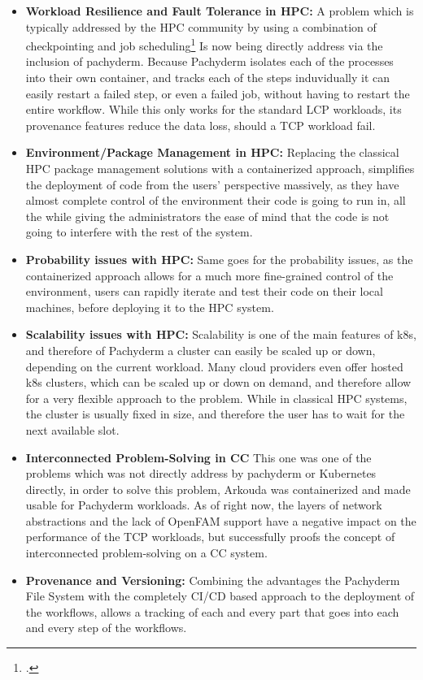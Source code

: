 \begin{itemize}
    \item \textbf{Workload Resilience and Fault Tolerance in HPC:}
    A problem which is typically addressed by the \ac{HPC} community by using a combination of checkpointing and job scheduling\footcite{jinOptimizingHPCFaultTolerant2010}
    Is now being directly address via the inclusion of pachyderm.
    Because Pachyderm isolates each of the processes into their own container, and tracks each of the steps induvidually
    it can easily restart a failed step, or even a failed job, without having to restart the entire workflow.
    While this only works for the standard \ac{LCP} workloads, its provenance features reduce the data loss, should a \ac{TCP} workload fail.
    \item \textbf{Environment/Package Management in HPC:} 
    Replacing the classical \ac{HPC} package management solutions with a containerized approach,
    simplifies the deployment of code from the users' perspective massively, as they have almost complete control of the environment their code 
    is going to run in, all the while giving the administrators the ease of mind that the code is not going to interfere with the rest of the system.
    \item \textbf{Probability issues with HPC:}
    Same goes for the probability issues, as the containerized approach allows for a much more fine-grained control of the environment,
    users can rapidly iterate and test their code on their local machines, before deploying it to the \ac{HPC} system.
    \item \textbf{Scalability issues with HPC:}
    Scalability is one of the main features of \ac{k8s}, and therefore of Pachyderm a cluster can easily be scaled up or down, depending on the current workload.
    Many cloud providers even offer hosted \ac{k8s} clusters, which can be scaled up or down on demand, and therefore allow for a very flexible approach to the problem.
    While in classical \ac{HPC} systems, the cluster is usually fixed in size, and therefore the user has to wait for the next available slot.
    \item \textbf{Interconnected Problem-Solving in \ac{CC}}
    This one was one of the problems which was not directly address by pachyderm or Kubernetes directly,
    in order to solve this problem, Arkouda was containerized and made usable for Pachyderm workloads.
    As of right now, the layers of network abstractions and the lack of OpenFAM support have a negative impact on the performance of the \ac{TCP} workloads,
    but successfully proofs the concept of interconnected problem-solving on a \ac{CC} system.
    \item \textbf{Provenance and Versioning:}
    Combining the advantages the Pachyderm File System with the completely \ac{CI/CD} based approach to the deployment of the workflows,
    allows a tracking of each and every part that goes into each and every step of the workflows.
\end{itemize}


